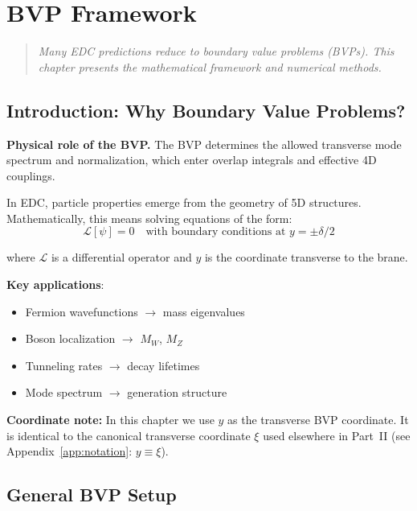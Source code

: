 \chapter{BVP Framework}
\label{ch:bvp}

\begin{quote}
\textit{Many EDC predictions reduce to boundary value problems (BVPs).
This chapter presents the mathematical framework and numerical methods.}
\end{quote}

\section{Introduction: Why Boundary Value Problems?}
\label{sec:bvp_intro}

\noindent\textbf{Physical role of the BVP.}
The BVP determines the allowed transverse mode spectrum and normalization,
which enter overlap integrals and effective 4D couplings.

\medskip
In EDC, particle properties emerge from the geometry of 5D structures.
Mathematically, this means solving equations of the form:
\begin{equation}
\mathcal{L}[\psi] = 0 \quad \text{with boundary conditions at } y = \pm \delta/2
\end{equation}

where $\mathcal{L}$ is a differential operator and $y$ is the coordinate
transverse to the brane.

\textbf{Key applications}:
\begin{itemize}[nosep]
\item Fermion wavefunctions $\to$ mass eigenvalues
\item Boson localization $\to$ $M_W$, $M_Z$
\item Tunneling rates $\to$ decay lifetimes
\item Mode spectrum $\to$ generation structure
\end{itemize}

\textbf{Coordinate note:} In this chapter we use $y$ as the transverse BVP
coordinate. It is identical to the canonical transverse coordinate $\xi$
used elsewhere in Part~II (see Appendix~\ref{app:notation}: $y \equiv \xi$).

\section{General BVP Setup}
\label{sec:bvp_setup}

